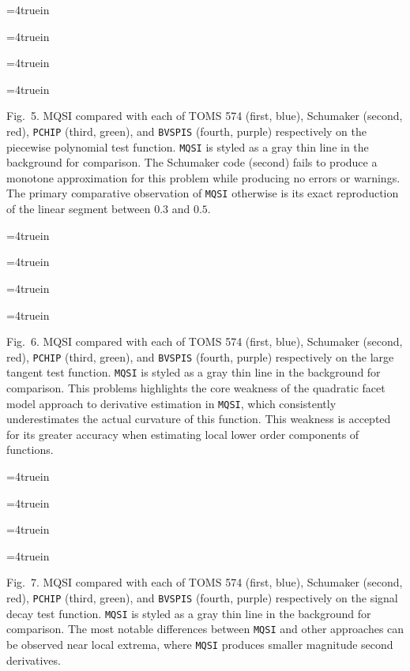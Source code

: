 \goodbreak

\beginred

\topinsert
\centerline{\epsfxsize=4truein }
\centerline{\epsfxsize=4truein }
\centerline{\epsfxsize=4truein }
\centerline{\epsfxsize=4truein }
{\narrower\noindent\rmVIII Fig.\ 5.
{\ttVIII MQSI} compared with each of TOMS 574 (first, blue), Schumaker
(second, red), {\tt PCHIP} (third, green), and {\tt BVSPIS} (fourth, purple)
respectively on the {\itVIII piecewise polynomial} test function. {\tt MQSI}
is styled as a gray thin line in the background for comparison. The
Schumaker code (second) fails to produce a monotone approximation for
this problem while producing no errors or warnings. The primary
comparative observation of {\tt MQSI} otherwise is its exact reproduction of
the linear segment between $0.3$ and $0.5$.
\par}
\endinsert


\topinsert
\centerline{\epsfxsize=4truein }
\centerline{\epsfxsize=4truein }
\centerline{\epsfxsize=4truein }
\centerline{\epsfxsize=4truein }
{\narrower\noindent\rmVIII Fig.\ 6.
{\ttVIII MQSI} compared with each of TOMS 574 (first, blue), Schumaker
(second, red), {\tt PCHIP} (third, green), and {\tt BVSPIS} (fourth, purple)
respectively on the {\itVIII large tangent} test function. {\tt MQSI} is
styled as a gray thin line in the background for comparison. This
problems highlights the core weakness of the quadratic facet model
approach to derivative estimation in {\tt MQSI}, which consistently
underestimates the actual curvature of this function. This weakness is
accepted for its greater accuracy when estimating local lower order
components of functions.
\par}
\endinsert


\topinsert
\centerline{\epsfxsize=4truein }
\centerline{\epsfxsize=4truein }
\centerline{\epsfxsize=4truein }
\centerline{\epsfxsize=4truein }
{\narrower\noindent\rmVIII Fig.\ 7.
{\ttVIII MQSI} compared with each of TOMS 574 (first, blue), Schumaker
(second, red), {\tt PCHIP} (third, green), and {\tt BVSPIS} (fourth, purple)
respectively on the {\itVIII signal decay} test function. {\tt MQSI} is
styled as a gray thin line in the background for comparison. The most
notable differences between {\tt MQSI} and other approaches can be observed
near local extrema, where {\tt MQSI} produces smaller magnitude second
derivatives.
\par}
\endinsert


